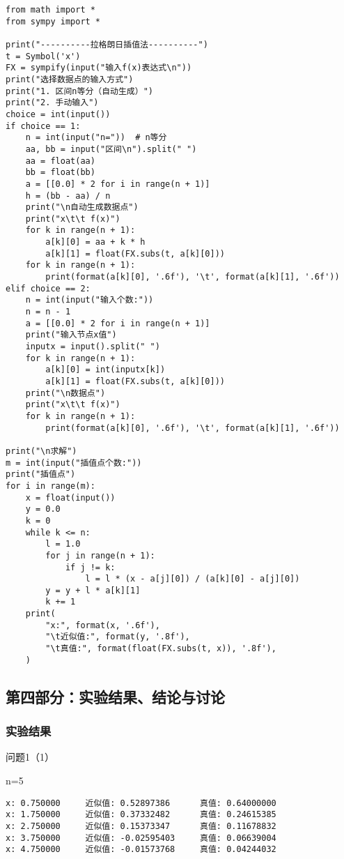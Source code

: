 \documentclass[a4paper,zihao=4,UTF8]{ctexart}
\begin{document}
\begin{lstlisting}[]
from math import *
from sympy import *

print("----------拉格朗日插值法----------")
t = Symbol('x')
FX = sympify(input("输入f(x)表达式\n"))
print("选择数据点的输入方式")
print("1. 区间n等分（自动生成）")
print("2. 手动输入")
choice = int(input())
if choice == 1:
    n = int(input("n="))  # n等分
    aa, bb = input("区间\n").split(" ")
    aa = float(aa)
    bb = float(bb)
    a = [[0.0] * 2 for i in range(n + 1)]
    h = (bb - aa) / n
    print("\n自动生成数据点")
    print("x\t\t f(x)")
    for k in range(n + 1):
        a[k][0] = aa + k * h
        a[k][1] = float(FX.subs(t, a[k][0]))
    for k in range(n + 1):
        print(format(a[k][0], '.6f'), '\t', format(a[k][1], '.6f'))
elif choice == 2:
    n = int(input("输入个数:"))
    n = n - 1
    a = [[0.0] * 2 for i in range(n + 1)]
    print("输入节点x值")
    inputx = input().split(" ")
    for k in range(n + 1):
        a[k][0] = int(inputx[k])
        a[k][1] = float(FX.subs(t, a[k][0]))
    print("\n数据点")
    print("x\t\t f(x)")
    for k in range(n + 1):
        print(format(a[k][0], '.6f'), '\t', format(a[k][1], '.6f'))

print("\n求解")
m = int(input("插值点个数:")) 
print("插值点")
for i in range(m):
    x = float(input())
    y = 0.0
    k = 0
    while k <= n:
        l = 1.0
        for j in range(n + 1):
            if j != k:
                l = l * (x - a[j][0]) / (a[k][0] - a[j][0])
        y = y + l * a[k][1]
        k += 1
    print(
        "x:", format(x, '.6f'),
        "\t近似值:", format(y, '.8f'),
        "\t真值:", format(float(FX.subs(t, x)), '.8f'),
    )
\end{lstlisting}

\subsection*{第四部分：实验结果、结论与讨论}

\subsubsection*{实验结果}

问题1（1）

n=5

\begin{lstlisting}
x: 0.750000     近似值: 0.52897386      真值: 0.64000000
x: 1.750000     近似值: 0.37332482      真值: 0.24615385
x: 2.750000     近似值: 0.15373347      真值: 0.11678832
x: 3.750000     近似值: -0.02595403     真值: 0.06639004
x: 4.750000     近似值: -0.01573768     真值: 0.04244032
\end{lstlisting}
\end{document}
